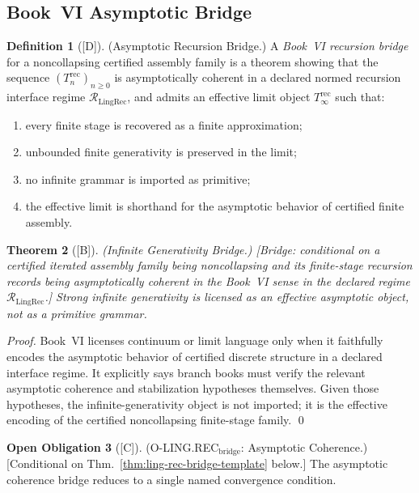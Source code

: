 \documentclass[12pt,oneside]{amsbook}
\theoremstyle{plain}
\newtheorem{theorem}{Theorem}[section]
\theoremstyle{definition}
\newtheorem{definition}[theorem]{Definition}
\newtheorem{obligation}[theorem]{Open Obligation}
\theoremstyle{remark}
\newcommand{\status}[1]{\textup{[#1]}}
\begin{document}
\subsection{Book~VI Asymptotic Bridge}

\begin{definition}[\status{D}]\label{def:ling-asymptotic-recursion-bridge}
\textup{(Asymptotic Recursion Bridge.)}
A \emph{Book~VI recursion bridge} for a noncollapsing certified
assembly family is a theorem showing that the sequence
$(T_n^{\mathrm{rec}})_{n \ge 0}$ is asymptotically coherent in
a declared normed recursion interface regime
$\mathcal{R}_{\mathrm{LingRec}}$, and admits an effective limit
object $T_\infty^{\mathrm{rec}}$ such that:
\begin{enumerate}[label=\textup{(\arabic*)}]
 \item every finite stage is recovered as a finite approximation;
 \item unbounded finite generativity is preserved in the limit;
 \item no infinite grammar is imported as primitive;
 \item the effective limit is shorthand for the asymptotic behavior
 of certified finite assembly.
\end{enumerate}
\end{definition}

\begin{theorem}[\status{B}]\label{thm:ling-rec-infty-bridge}
\textup{(Infinite Generativity Bridge.)}
\textup{[Bridge: conditional on a certified iterated assembly family
being noncollapsing and its finite-stage recursion records being
asymptotically coherent in the Book~VI sense in the declared regime
$\mathcal{R}_{\mathrm{LingRec}}$.]}
Strong infinite generativity is licensed as an effective asymptotic
object, not as a primitive grammar.
\end{theorem}

\begin{proof}
Book~VI licenses continuum or limit language only when it faithfully
encodes the asymptotic behavior of certified discrete structure in a
declared interface regime. It explicitly says branch books must
verify the relevant asymptotic coherence and stabilization hypotheses
themselves. Given those hypotheses, the infinite-generativity object
is not imported; it is the effective encoding of the certified
noncollapsing finite-stage family.
\qed
\end{proof}

\begin{obligation}[\status{C}]\label{ob:ling-rec-infty-bridge}
\textup{(O-LING.REC$_{\mathrm{bridge}}$: Asymptotic Coherence.)}
\textup{[Conditional on Thm.~\ref{thm:ling-rec-bridge-template} below.]}
The asymptotic coherence bridge reduces to a single named
convergence condition.
\end{obligation}
\end{document}
